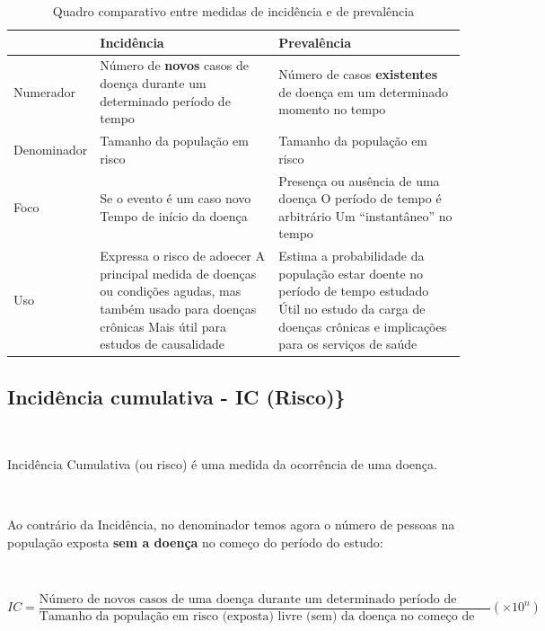 \documentclass[
]{book}
\begin{document}
\hfill\break

\begin{table}[h]
\centering
\caption{Quadro comparativo entre medidas de incidência e de prevalência}
\begin{tabular}{|p{3cm}|p{6cm}|p{6cm}|}
\hline
&  Incidência & Prevalência  \\
\hline
Numerador & Número de \textbf{novos} casos de doença durante um determinado período de tempo & Número de casos \textbf{existentes} de doença em um determinado momento no tempo\\
\hline
Denominador & Tamanho da população em risco & Tamanho da população em risco  \\
\hline
Foco & Se o evento é um caso novo \newline Tempo de início da doença  & Presença ou ausência de uma doença \newline  O período de tempo é arbitrário \newline Um ``instantâneo'' no tempo \\
\hline
Uso  & Expressa o risco de adoecer \newline A principal medida de doenças ou condições agudas, mas também usado para doenças crônicas \newline Mais útil para estudos de causalidade  & Estima a probabilidade da população estar doente no período de tempo estudado \newline Útil no estudo da carga de doenças crônicas e implicações para os serviços de saúde\\
\hline 
\end{tabular}
\label{tab1}
\end{table} 

\hfill\break

\hypertarget{inciduxeancia-cumulativa---ic-risco}{%
\subsection{Incidência cumulativa - IC (Risco)\}}\label{inciduxeancia-cumulativa---ic-risco}}

~

Incidência Cumulativa (ou risco) é uma medida da ocorrência de uma doença.

~

Ao contrário da Incidência, no denominador temos agora o número de pessoas na população exposta \textbf{sem a doença} no começo do período do estudo:

~

\[
IC=\frac{\text{Número de novos casos de uma doença durante um determinado período de tempo}}{\text{Tamanho da população em risco (exposta) livre (sem) da doença no começo de um determinado período de tempo}} (\times 10^{n}) 
\]
\end{document}
